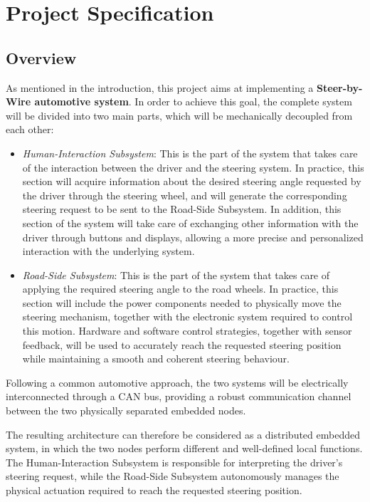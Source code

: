\chapter{Project Specification}

\section{Overview}
\label{overview}

As mentioned in the introduction, this project aims at implementing a \textbf{Steer-by-Wire automotive system}. In order to achieve this goal, the complete system will be divided into two main parts, which will be mechanically decoupled from each other:

\begin{itemize}
	\item \textit{Human-Interaction Subsystem}: This is the part of the system that takes care of the interaction between the driver and the steering system. In practice, this section will acquire information about the desired steering angle requested by the driver through the steering wheel, and will generate the corresponding steering request to be sent to the Road-Side Subsystem. In addition, this section of the system will take care of exchanging other information with the driver through buttons and displays, allowing a more precise and personalized interaction with the underlying system.
	
	\item \textit{Road-Side Subsystem}: This is the part of the system that takes care of applying the required steering angle to the road wheels. In practice, this section will include the power components needed to physically move the steering mechanism, together with the electronic system required to control this motion. Hardware and software control strategies, together with sensor feedback, will be used to accurately reach the requested steering position while maintaining a smooth and coherent steering behaviour.
\end{itemize}

Following a common automotive approach, the two systems will be electrically interconnected through a CAN bus, providing a robust communication channel between the two physically separated embedded nodes.

The resulting architecture can therefore be considered as a distributed embedded system, in which the two nodes perform different and well-defined local functions. The Human-Interaction Subsystem is responsible for interpreting the driver's steering request, while the Road-Side Subsystem autonomously manages the physical actuation required to reach the requested steering position.

